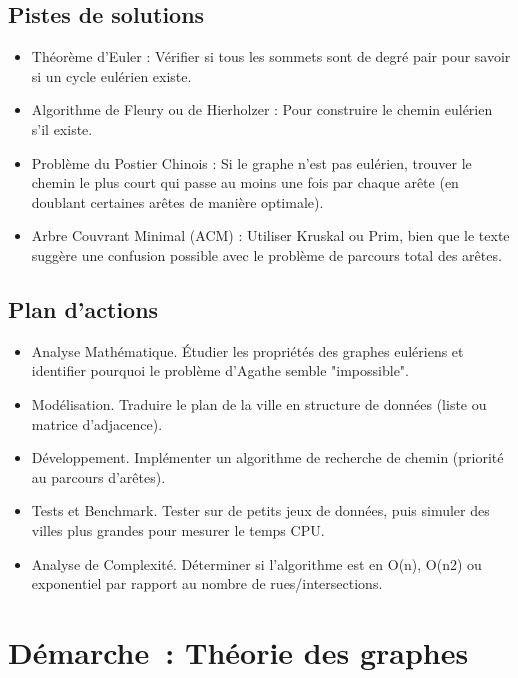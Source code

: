 \subsection*{Pistes de solutions}
{}
\begin{itemize}
	\item Théorème d'Euler : Vérifier si tous les sommets sont de degré pair pour savoir si un cycle eulérien existe.
	\item Algorithme de Fleury ou de Hierholzer : Pour construire le chemin eulérien s'il existe.
	\item Problème du Postier Chinois : Si le graphe n'est pas eulérien, trouver le chemin le plus court qui passe au moins une fois par chaque arête (en doublant certaines arêtes de manière optimale).
	\item Arbre Couvrant Minimal (ACM) : Utiliser Kruskal ou Prim, bien que le texte suggère une confusion possible avec le problème de parcours total des arêtes.
\end{itemize}

\subsection*{Plan d'actions}
{}
\begin{itemize}
	\item Analyse Mathématique. Étudier les propriétés des graphes eulériens et identifier pourquoi le problème d'Agathe semble "impossible".
	\item Modélisation. Traduire le plan de la ville en structure de données (liste ou matrice d'adjacence).
	\item Développement. Implémenter un algorithme de recherche de chemin (priorité au parcours d'arêtes).
	\item Tests et Benchmark. Tester sur de petits jeux de données, puis simuler des villes plus grandes pour mesurer le temps CPU.
	\item Analyse de Complexité. Déterminer si l'algorithme est en O(n), O(n2) ou exponentiel par rapport au nombre de rues/intersections.
\end{itemize}

\newpage
\section*{Démarche~: Théorie des graphes}

